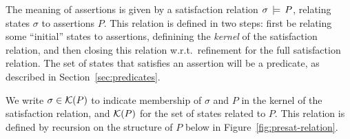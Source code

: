 \documentclass[11pt]{article}
\begin{document}
The meaning of assertions is given by a satisfaction relation $\sigma \,\models\, P$, relating states $\sigma$ to assertions $P$. This relation is defined in two steps: first be relating some ``initial'' states to assertions, definining the \emph{kernel} of the satisfaction relation, and then closing this relation w.r.t.~refinement for the full satisfaction relation. The set of states that satisfies an assertion will be a predicate, as described in Section~\ref{sec:predicates}. 

We write $\sigma \in \mathcal{K}(P)$ to indicate membership of $\sigma$ and $P$ in the kernel of the satisfaction relation, and $\mathcal{K}(P)$ for the set of states related to $P$. This relation is defined by recursion on the structure of $P$ below in Figure~\ref{fig:presat-relation}. 

\begin{figure}[ht]
	\centering
\end{figure}
\end{document}
